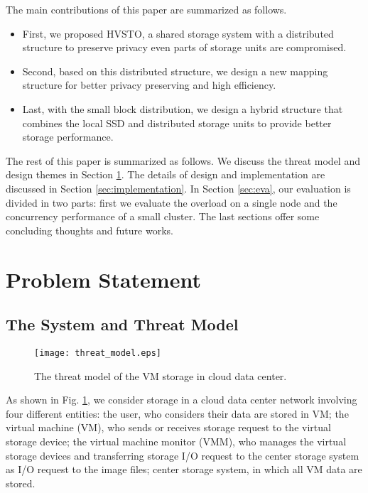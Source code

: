 \documentclass[conference]{IEEEtran}
\begin{document}
The main contributions of this paper are summarized as follows.
\begin{itemize}
\item First, we proposed HVSTO, a shared storage system with a distributed structure to preserve privacy even parts of storage units are compromised. 
\item Second, based on this distributed structure, we design a new mapping structure for better privacy preserving and high efficiency. 
\item Last, with the small block distribution, we design a hybrid structure that combines the local SSD and distributed storage units to provide better storage performance.
\end{itemize}



The rest of this paper is summarized as follows. We discuss the threat model and design themes in Section \ref{sec:design}. The details of design and implementation are discussed in Section \ref{sec:implementation}. In Section \ref{sec:eva}, our evaluation is divided in two parts: first we evaluate the overload on a single node and the concurrency performance of a small cluster. The last sections offer some concluding thoughts and future works.





















\section{Problem Statement}
\label{sec:design}


\subsection{The System and Threat Model}
\begin{figure}[!h]
\centering
\texttt{[image: threat\_model.eps]}
\caption{The threat model of the VM storage in cloud data center.}
\label{fig:threat_model}
\end{figure}


As shown in Fig. \ref{fig:threat_model}, we consider storage in a cloud data center network involving four different entities: the user, who considers their data are stored in VM; the virtual machine (VM), who sends or receives storage request to the virtual storage device; the virtual machine monitor (VMM), who manages the virtual storage devices and transferring storage I/O request to the center storage system as I/O request to the image files; center storage system, in which all VM data are stored.
\end{document}
